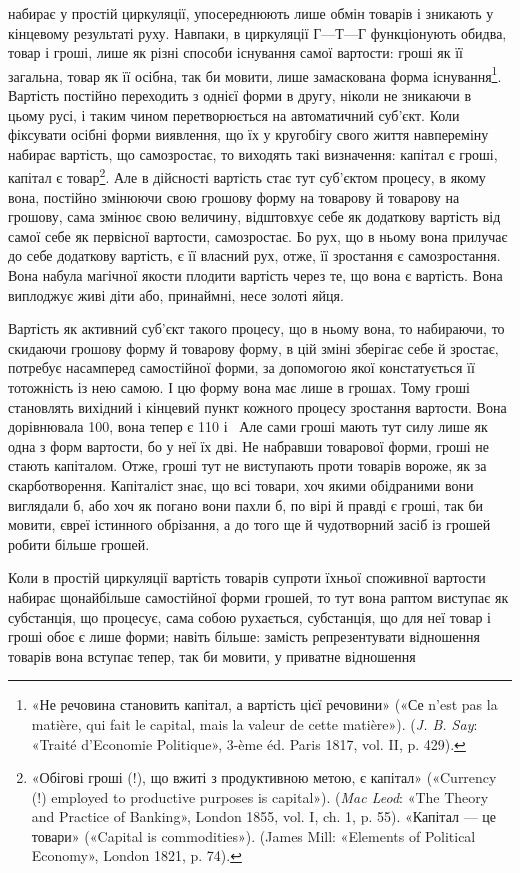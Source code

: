 \parcont{}  %
набирає у простій циркуляції, упосереднюють лише обмін товарів
і зникають у кінцевому результаті руху. Навпаки, в циркуляції
$Г — Т — Г$ функціонують обидва, товар і гроші, лише як різні
способи існування самої вартости: гроші як її загальна, товар
як її осібна, так би мовити, лише замаскована форма існування\footnote{
«Не речовина становить капітал, а вартість цієї речовини» («Се
n’est pas la matière, qui fait le capital, mais la valeur de cette matière»).
(\emph{J. B. Say}: «Traité d’Economie Politique», 3-ème éd. Paris 1817, vol. II,
p. 429).
}.
Вартість постійно переходить з однієї форми в другу, ніколи не
зникаючи в цьому русі, і таким чином перетворюється на автоматичний
суб’єкт. Коли фіксувати осібні форми виявлення, що
їх у кругобігу свого життя навпереміну набирає вартість, що
самозростає, то виходять такі визначення: капітал є гроші, капітал
є товар\footnote{
«Обігові гроші (!), що вжиті з продуктивною метою, є капітал»
(«Currency (!) employed to productive purposes is capital»). (\emph{Mac Leod}:
«The Theory and Practice of Banking», London 1855, vol. I, ch. 1, p. 55).
«Капітал — це товари» («Capital is commodities»). (James Mill: «Elements
of Political Economy», London 1821, p. 74).
}. Але в дійсності вартість стає тут суб’єктом процесу,
в якому вона, постійно змінюючи свою грошову форму на товарову
й товарову на грошову, сама змінює свою величину, відштовхує
себе як додаткову вартість від самої себе як первісної
вартости, самозростає. Бо рух, що в ньому вона прилучає до себе
додаткову вартість, є її власний рух, отже, її зростання є самозростання.
Вона набула магічної якости плодити вартість через
те, що вона є вартість. Вона виплоджує живі діти або, принаймні,
несе золоті яйця.

Вартість як активний суб’єкт такого процесу, що в ньому
вона, то набираючи, то скидаючи грошову форму й товарову
форму, в цій зміні зберігає себе й зростає, потребує насамперед
самостійної форми, за допомогою якої констатується її тотожність
із нею самою. І цю форму вона має лише в грошах. Тому гроші
становлять вихідний і кінцевий пункт кожного процесу зростання
вартости. Вона дорівнювала 100, вона тепер
є 110 і~ Але сами гроші мають тут силу
лише як одна з форм вартости, бо у неї їх дві. Не набравши товарової
форми, гроші не стають капіталом. Отже, гроші тут не виступають
проти товарів вороже, як за скарботворення. Капіталіст
знає, що всі товари, хоч якими обідраними вони виглядали б,
або хоч як погано вони пахли б, по вірі й правді є гроші, так би
мовити, євреї істинного обрізання, а до того ще й чудотворний
засіб із грошей робити більше грошей.

Коли в простій циркуляції вартість товарів супроти їхньої
споживної вартости набирає щонайбільше самостійної форми
грошей, то тут вона раптом виступає як субстанція, що процесує,
сама собою рухається, субстанція, що для неї товар і гроші обоє
є лише форми; навіть більше: замість репрезентувати відношення
товарів вона вступає тепер, так би мовити, у приватне відношення
\parbreak{}  %
